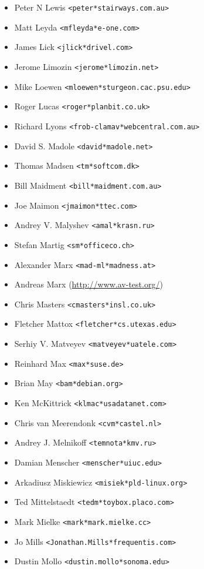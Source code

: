 \documentclass[a4paper,titlepage,12pt]{article}
\newcommand{\email}[1]{\texttt{#1}}
\begin{document}
\begin{itemize}
	\item Peter N Lewis \email{<peter*stairways.com.au>}
	\item Matt Leyda \email{<mfleyda*e-one.com>}
	\item James Lick \email{<jlick*drivel.com>}
	\item Jerome Limozin \email{<jerome*limozin.net>}
	\item Mike Loewen \email{<mloewen*sturgeon.cac.psu.edu>}
	\item Roger Lucas \email{<roger*planbit.co.uk>}
	\item Richard Lyons \email{<frob-clamav*webcentral.com.au>}
	\item David S. Madole \email{<david*madole.net>}
	\item Thomas Madsen \email{<tm*softcom.dk>}
	\item Bill Maidment \email{<bill*maidment.com.au>}
	\item Joe Maimon \email{<jmaimon*ttec.com>}
	\item Andrey V. Malyshev \email{<amal*krasn.ru>}
	\item Stefan Martig \email{<sm*officeco.ch>}
	\item Alexander Marx \email{<mad-ml*madness.at>}
	\item Andreas Marx (\url{http://www.av-test.org/})
	\item Chris Masters \email{<cmasters*insl.co.uk>}
	\item Fletcher Mattox \email{<fletcher*cs.utexas.edu>}
	\item Serhiy V. Matveyev \email{<matveyev*uatele.com>}
	\item Reinhard Max \email{<max*suse.de>}
	\item Brian May \email{<bam*debian.org>}
	\item Ken McKittrick \email{<klmac*usadatanet.com>}
	\item Chris van Meerendonk \email{<cvm*castel.nl>}
	\item Andrey J. Melnikoff \email{<temnota*kmv.ru>}
	\item Damian Menscher \email{<menscher*uiuc.edu>}
	\item Arkadiusz Miskiewicz \email{<misiek*pld-linux.org>}
	\item Ted Mittelstaedt \email{<tedm*toybox.placo.com>}
	\item Mark Mielke \email{<mark*mark.mielke.cc>}
	\item Jo Mills \email{<Jonathan.Mills*frequentis.com>}
	\item Dustin Mollo \email{<dustin.mollo*sonoma.edu>}

\end{itemize}
\end{document}
